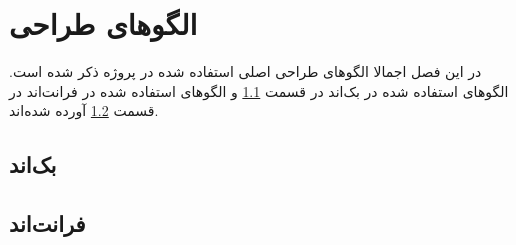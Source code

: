 \chapter{
الگوهای طراحی
}

در این فصل اجمالا الگوهای طراحی اصلی استفاده شده در پروژه ذکر شده است. الگوهای استفاده شده در بک‌اند در قسمت \ref{designpattern:back} و الگوهای استفاده شده در فرانت‌اند در قسمت \ref{designpattern:front} آورده شده‌اند.

\newpage
\section{بک‌اند}
\label{designpattern:back}


\newpage

\section{فرانت‌اند}
\label{designpattern:front}
